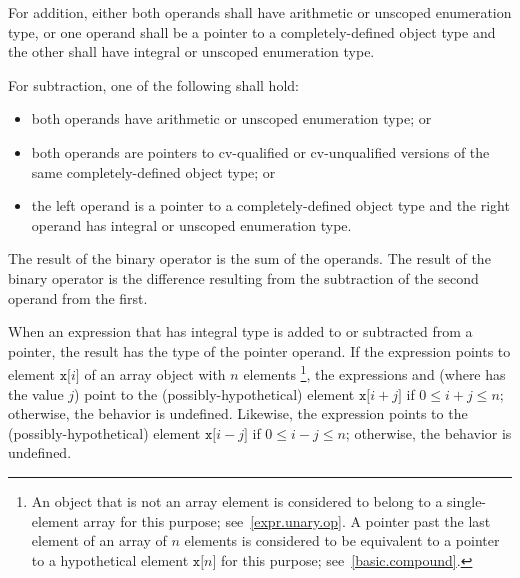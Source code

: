 %
For addition, either both operands shall have arithmetic or unscoped enumeration
type, or one operand shall be a pointer to a completely-defined object
type and the other shall have integral or unscoped enumeration type.

\pnum
For subtraction, one of the following shall hold:

\begin{itemize}
\item both operands have arithmetic or unscoped enumeration type; or

%
\item both operands are pointers to cv-qualified or cv-unqualified
versions of the same completely-defined object type; or

\item the left operand is a pointer to a completely-defined object type
and the right operand has integral or unscoped enumeration type.
\end{itemize}

\pnum
The result of the binary \tcode{+} operator is the sum of the operands.
The result of the binary \tcode{-} operator is the difference resulting
from the subtraction of the second operand from the first.

\pnum
{}%
When an expression that has integral type is added to or subtracted from
a pointer, the result has the type of the pointer operand.
If the expression  points to element $\mathtt{x[}i\mathtt{]}$
of an array object  with $n$ elements%
\footnote{An object that is not an array element is considered to belong to a
single-element array for this purpose; see~\ref{expr.unary.op}.
A pointer past the last element of an array  of $n$ elements
is considered to be equivalent to a pointer to a hypothetical element
$\mathtt{x[}n\mathtt{]}$ for this purpose; see~\ref{basic.compound}.},
the expressions  and 
(where  has the value $j$)
point to the (possibly-hypothetical) element
$\mathtt{x[}i + j\mathtt{]}$ if $0 \le i + j \le n$;
otherwise, the behavior is undefined.
Likewise, the expression 
points to the (possibly-hypothetical) element
$\mathtt{x[}i - j\mathtt{]}$ if $0 \le i - j \le n$;
otherwise, the behavior is undefined.

